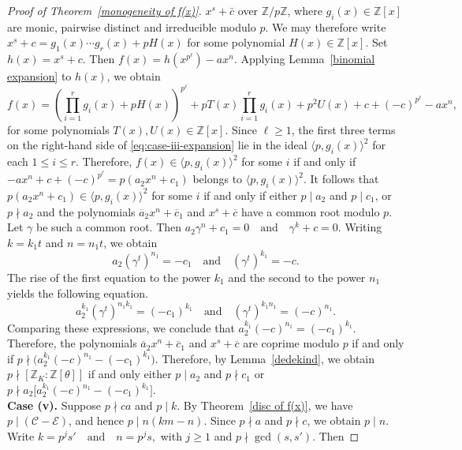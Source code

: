 \documentclass[table]{amsart}
\numberwithin{equation}{section}
\begin{document}
\begin{proof}[Proof of Theorem~\ref{monogeneity of f(x)}]
$x^{s}+\bar c$ over $\mathbb{Z}/p\mathbb{Z}$, where
$g_i(x)\in\mathbb{Z}[x]$ are monic, pairwise distinct and irreducible
modulo $p$. We may therefore write $x^{s}+c = g_{1}(x)\cdots g_{r}(x) + pH(x)$ for some polynomial $H(x)\in\mathbb{Z}[x]$. Set $h(x)=x^{s}+c$.
Then $f(x)=h(x^{p^{\ell}})-ax^{n}.$ Applying Lemma~\ref{binomial expansion} to $h(x)$, we obtain
\begin{equation}\label{eq:case-iii-expansion}
f(x)= \left(\prod_{i=1}^{r} g_i(x) + pH(x)\right)^{p^{\ell}}
   + pT(x)\prod_{i=1}^{r} g_i(x)
   + p^{2}U(x) + c + (-c)^{p^{\ell}} - ax^{n},
\end{equation} 
for some polynomials $T(x),U(x)\in\mathbb{Z}[x]$.
Since $\ell\ge 1$, the first three terms on the right-hand side of
\eqref{eq:case-iii-expansion} lie in the ideal
$\langle p, g_i(x)\rangle^{2}$ for each $1\le i\le r$.
Therefore,
$f(x)\in\langle p, g_i(x)\rangle^{2}$ for some $i$
if and only if $-ax^{n}+c+(-c)^{p^{\ell}} = p(a_{2}x^{n}+c_{1})$
belongs to $\langle p, g_i(x)\rangle^{2}$. It follows that
$p(a_{2}x^{n}+c_{1})\in\langle p, g_i(x)\rangle^{2}$
for some $i$ if and only if either $p\mid a_{2}$ and $p\mid c_{1}$,
or $p\nmid a_{2}$ and the polynomials
$\overline{a}_{2}x^{n}+\overline{c}_{1}$ and $x^{s}+\overline{c}$
have a common root modulo $p$. Let $\gamma$ be such a common root.
Then $a_{2}\gamma^{n}+c_{1}=0
\quad \text{and} \quad
\gamma^{k}+c=0.$ Writing $k=k_{1}t$ and $n=n_{1}t$, we obtain
\[
a_{2}(\gamma^{t})^{n_{1}}=-c_{1}
\quad \text{and} \quad
(\gamma^{t})^{k_{1}}=-c.
\]
The rise of the first equation to the power $k_{1}$ and the second to the power $n_{1}$ yields the following equation.
\[
a_{2}^{k_{1}}(\gamma^{t})^{n_{1}k_{1}}
=(-c_{1})^{k_{1}}
\quad \text{and} \quad
(\gamma^{t})^{k_{1}n_{1}}
=(-c)^{n_{1}}.
\]
Comparing these expressions, we conclude that $a_{2}^{k_{1}}(-c)^{n_{1}} = (-c_{1})^{k_{1}}.$ Therefore, the polynomials
$\overline{a}_{2}x^{n}+\overline{c}_{1}$ and $x^{s}+\overline{c}$
are coprime modulo $p$ if and only if $p\nmid \bigl(a_{2}^{k_{1}}(-c)^{n_{1}}-(-c_{1})^{k_{1}}\bigr).$ Therefore, by Lemma~\ref{dedekind}, we obtain $p\nmid [\mathbb{Z}_{K}:\mathbb{Z}[\theta]]$ if and only either $p\mid a_2$ and $p\nmid c_1$ or $p\nmid a_2\bigl[a_{2}^{k_{1}}(-c)^{n_{1}}-(-c_{1})^{k_{1}}\bigr]$.\\[2mm]
\textbf{Case (v).} Suppose $p \nmid ca$ and $p \mid k$. By Theorem~\ref{disc of f(x)}, we have 
$p \mid (\mathcal{C} - \mathcal{E})$, and hence $p \mid n(km - n).$
Since $p \nmid a$ and $p \nmid c$, we obtain $p \mid n$. Write $k = p^{j}s' \quad \text{and} \quad n = p^{j}s,$ with $j \ge 1$ and $p \nmid \gcd(s,s')$. Then

\end{proof}
\end{document}
